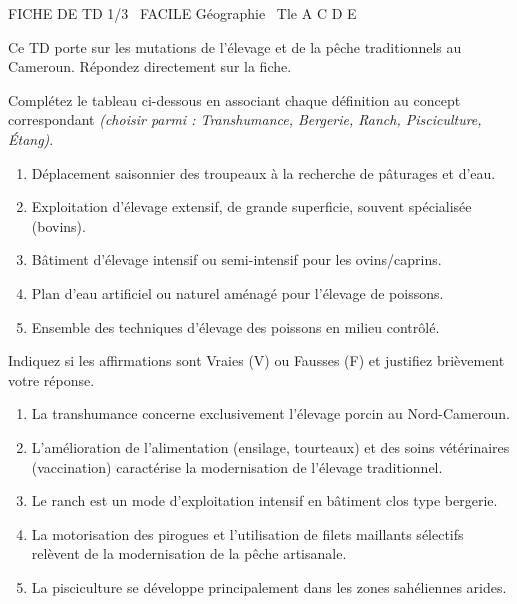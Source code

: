 \documentclass[11pt]{article}
\begin{document}
\begin{tcolorbox}[enhanced,colback=popink,colframe=popink,arc=10pt,boxrule=0pt,left=12pt,right=12pt,top=9pt,bottom=9pt]
{\color{white}\popxbold\small FICHE DE TD 1/3 \textbullet\ FACILE \hfill Géographie \textbullet\ Tle A C D E\par}
\end{tcolorbox}
\vspace{4pt}
Ce TD porte sur les mutations de l'élevage et de la pêche traditionnels au Cameroun. Répondez directement sur la fiche.

\begin{exercice}
Complétez le tableau ci-dessous en associant chaque définition au concept correspondant \textit{(choisir parmi : Transhumance, Bergerie, Ranch, Pisciculture, Étang)}.
\begin{enumerate}
    \item Déplacement saisonnier des troupeaux à la recherche de pâturages et d'eau.
    \item Exploitation d'élevage extensif, de grande superficie, souvent spécialisée (bovins).
    \item Bâtiment d'élevage intensif ou semi-intensif pour les ovins/caprins.
    \item Plan d'eau artificiel ou naturel aménagé pour l'élevage de poissons.
    \item Ensemble des techniques d'élevage des poissons en milieu contrôlé.
\end{enumerate}
\end{exercice}

\begin{exercice}
Indiquez si les affirmations sont Vraies (V) ou Fausses (F) et justifiez brièvement votre réponse.
\begin{enumerate}
    \item La transhumance concerne exclusivement l'élevage porcin au Nord-Cameroun.
    \item L'amélioration de l'alimentation (ensilage, tourteaux) et des soins vétérinaires (vaccination) caractérise la modernisation de l'élevage traditionnel.
    \item Le ranch est un mode d'exploitation intensif en bâtiment clos type bergerie.
    \item La motorisation des pirogues et l'utilisation de filets maillants sélectifs relèvent de la modernisation de la pêche artisanale.
    \item La pisciculture se développe principalement dans les zones sahéliennes arides.
\end{enumerate}
\end{exercice}
\end{document}
